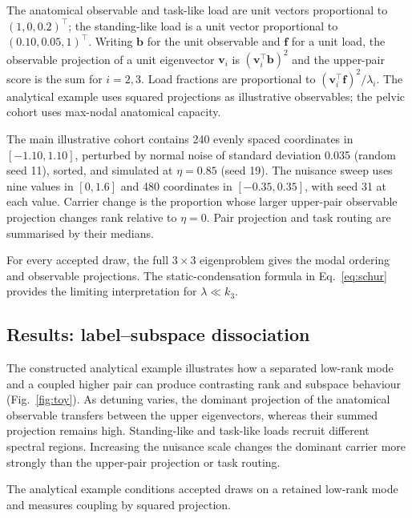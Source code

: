 \documentclass[pdflatex,sn-basic]{sn-jnl}
\begin{document}
The anatomical observable and task-like load are unit vectors proportional to $(1,0,0.2)^\top$; the standing-like load is a unit vector proportional to $(0.10,0.05,1)^\top$. Writing $\mathbf b$ for the unit observable and $\mathbf f$ for a unit load, the observable projection of a unit eigenvector $\mathbf v_i$ is $(\mathbf v_i^\top\mathbf b)^2$ and the upper-pair score is the sum for $i=2,3$. Load fractions are proportional to $(\mathbf v_i^\top\mathbf f)^2/\lambda_i$. The analytical example uses squared projections as illustrative observables; the pelvic cohort uses max-nodal anatomical capacity.

The main illustrative cohort contains 240 evenly spaced coordinates in $[-1.10,1.10]$, perturbed by normal noise of standard deviation 0.035 (random seed 11), sorted, and simulated at $\eta=0.85$ (seed 19). The nuisance sweep uses nine values in $[0,1.6]$ and 480 coordinates in $[-0.35,0.35]$, with seed 31 at each value. Carrier change is the proportion whose larger upper-pair observable projection changes rank relative to $\eta=0$. Pair projection and task routing are summarised by their medians.

For every accepted draw, the full $3\times3$ eigenproblem gives the modal ordering and observable projections. The static-condensation formula in Eq.~\eqref{eq:schur} provides the limiting interpretation for $\lambda\ll k_3$.


\subsection{Results: label--subspace dissociation}
\label{sec:toy-results}

The constructed analytical example illustrates how a separated low-rank mode and a coupled higher pair can produce contrasting rank and subspace behaviour (Fig.~\ref{fig:toy}). As detuning varies, the dominant projection of the anatomical observable transfers between the upper eigenvectors, whereas their summed projection remains high. Standing-like and task-like loads recruit different spectral regions. Increasing the nuisance scale changes the dominant carrier more strongly than the upper-pair projection or task routing.

The analytical example conditions accepted draws on a retained low-rank mode and measures coupling by squared projection.
\end{document}
